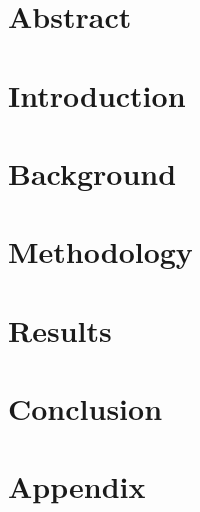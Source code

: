 \documentclass[12pt,a4paper]{article}
\begin{document}
\clearpage

\clearpage
\section*{Abstract}

\clearpage

\tableofcontents
\clearpage

\section{Introduction}
\label{introduction}


\section{Background}
\label{background}


\section{Methodology}
\label{methodology}


\section{Results}
\label{results}


\section{Conclusion}
\label{conclusion}


\newpage
\printbibliography

\newpage
\appendix
\section{Appendix}

\end{document}
